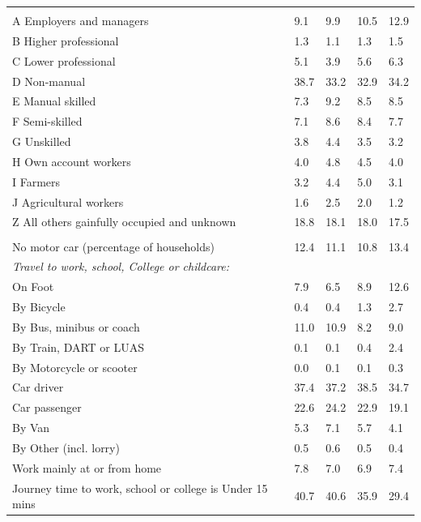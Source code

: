 \documentclass{article}
\begin{document}
\begin{table}[h]
\begin{tabular}{KTTTT}
\hline
    \\ 
    \hline
A Employers and managers &  9.1&  9.9& 10.5& 12.9\\
B Higher professional & 1.3& 1.1& 1.3& 1.5\\
C Lower professional & 5.1& 3.9& 5.6& 6.3\\
D Non-manual & 38.7& 33.2& 32.9& 34.2\\
E Manual skilled & 7.3& 9.2& 8.5& 8.5\\
F Semi-skilled & 7.1& 8.6& 8.4& 7.7\\
G Unskilled & 3.8& 4.4& 3.5& 3.2\\
H Own account workers & 4.0& 4.8& 4.5& 4.0\\
I Farmers & 3.2& 4.4& 5.0& 3.1\\
J Agricultural workers & 1.6& 2.5& 2.0& 1.2\\
Z All others gainfully occupied and unknown & 18.8& 18.1& 18.0& 17.5\\
\hline
{}\hline
    \\ 
    \hline
No motor car (percentage of households) & 12.4& 11.1& 10.8& 
13.4\\
    \hline 
\emph{Travel to work, school, College or childcare:} & & & \\
\quad On Foot &  7.9&  6.5&  8.9& 12.6\\ 
\quad By Bicycle & 0.4& 0.4& 1.3& 2.7\\ 
\quad By Bus, minibus or coach & 11.0& 10.9&  8.2&  9.0\\
\quad By Train, DART or LUAS & 0.1& 0.1& 0.4& 2.4\\
\quad By Motorcycle or scooter & 0.0& 0.1& 0.1& 0.3\\
\quad Car driver & 37.4 & 37.2& 38.5& 34.7\\
\quad Car passenger & 22.6& 24.2& 22.9& 19.1\\
\quad By Van & 5.3& 7.1& 5.7& 4.1\\
\quad By Other (incl. lorry) & 0.5& 0.6& 0.5& 0.4\\
    \hline
Work mainly at or from home & 7.8& 7.0& 6.9& 7.4\\
Journey time to work, school or college is Under 15 mins & 40.7& 40.6& 35.9& 29.4\\

\end{tabular}
\end{table}
\end{document}
